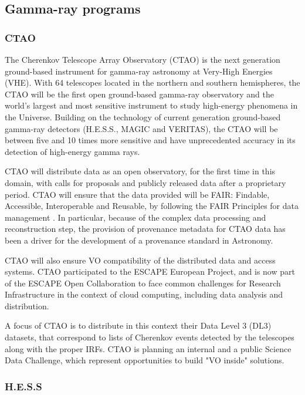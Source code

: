 \documentclass[11pt,a4paper]{ivoa}
\begin{document}
\subsection{Gamma-ray programs}

\subsubsection{CTAO}

The Cherenkov Telescope Array Observatory (CTAO) is the next generation ground-based instrument for gamma-ray astronomy at Very-High Energies (VHE). With 64 telescopes located in the northern and southern hemispheres, the CTAO will be the first open ground-based gamma-ray observatory and the world’s largest and most sensitive instrument to study high-energy phenomena in the Universe.
Building on the technology of current generation ground-based gamma-ray detectors (H.E.S.S., MAGIC and VERITAS), the CTAO will be between five and 10 times more sensitive and have unprecedented accuracy in its detection of high-energy gamma rays.

CTAO will distribute data as an open observatory, for the first time in this domain, with calls for proposals and publicly released data after a proprietary period. CTAO will ensure that the data provided will be FAIR: Findable, Accessible, Interoperable and Reusable, by following the FAIR Principles for data management \citep{Wilkinson2016}. In particular, because of the complex data processing and reconstruction step, the provision of provenance metadata for CTAO data has been a driver for the development of a provenance standard in Astronomy.

CTAO will also ensure VO compatibility of the distributed data and access systems. CTAO participated to the ESCAPE European Project, and is now part of the ESCAPE Open Collaboration to face common challenges for Research Infrastructure in the context of cloud computing, including data analysis and distribution.

A focus of CTAO is to distribute in this context their Data Level 3 (DL3) datasets, that correspond to lists of Cherenkov events detected by the telescopes along with the proper IRFs. CTAO is planning an internal and a public Science Data Challenge, which represent opportunities to build "VO inside" solutions.

\subsubsection{H.E.S.S}
\label{sec:hess}
\end{document}
